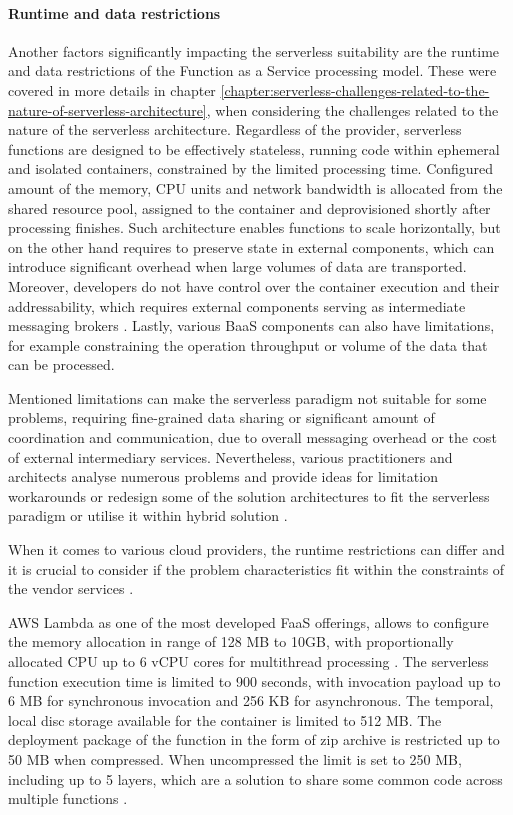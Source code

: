 \paragraph{Runtime and data restrictions} \label{chapter:serverless-processing-limitations-tunrime-and-data-restrictions}

Another factors significantly impacting the serverless suitability are the runtime and data restrictions of the Function as a Service processing model. These were covered in more details in chapter \ref{chapter:serverless-challenges-related-to-the-nature-of-serverless-architecture}, when considering the challenges related to the nature of the serverless architecture.
Regardless of the provider, serverless functions are designed to be effectively stateless, running code within ephemeral and isolated containers, constrained by the limited processing time. Configured amount of the memory, CPU units and network bandwidth is allocated from the shared resource pool, assigned to the container and deprovisioned shortly after processing finishes.
Such architecture enables functions to scale horizontally, but on the other hand requires to preserve state in external components, which can introduce significant overhead when large volumes of data are transported.
Moreover, developers do not have control over the container execution and their addressability, which requires external components serving as intermediate messaging brokers \cite{MartinFowlerServerless}. Lastly, various BaaS components can also have limitations, for example constraining the operation throughput or volume of the data that can be processed.

Mentioned limitations can make the serverless paradigm not suitable for some problems, requiring fine-grained data sharing or significant amount of coordination and communication, due to overall messaging overhead or the cost of external intermediary services.
Nevertheless, various practitioners and architects analyse numerous problems and provide ideas for limitation workarounds or redesign some of the solution architectures to fit the serverless paradigm or utilise it within hybrid solution \cite{BerkeleyServerless}.

When it comes to various cloud providers, the runtime restrictions can differ and it is crucial to consider if the problem characteristics fit within the constraints of the vendor services \cite{LeveragingServerlessCloudComputingArchitectures}.

AWS Lambda \cite{AWSLambdaQuotas} as one of the most developed FaaS offerings, allows to configure the memory allocation in range of 128 MB to 10GB, with proportionally allocated CPU up to 6 vCPU cores for multithread processing \cite{AWSLambdaRAMandCPU}.
The serverless function execution time is limited to 900 seconds, with invocation payload up to 6 MB for synchronous invocation and 256 KB for asynchronous.
The temporal, local disc storage available for the container is limited to 512 MB.
The deployment package of the function in the form of zip archive is restricted up to 50 MB when compressed. When uncompressed the limit is set to 250 MB, including up to 5 layers, which are a solution to share some common code across multiple functions \cite{EvaluationOfServerlessApplicationProgrammingModel}.


